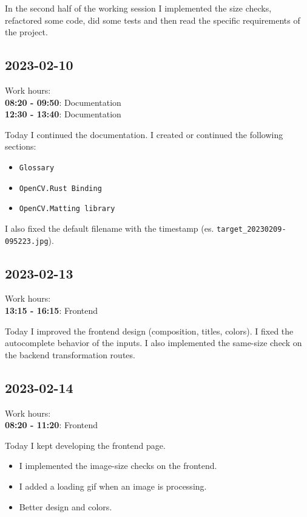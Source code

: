 \documentclass{article}
\begin{document}
In the second half of the working session I implemented the size checks, refactored some code,
did some tests and then read the specific requirements of the project.

\subsection{2023-02-10}

Work hours:\\
\textbf{08:20 - 09:50}: Documentation \\
\textbf{12:30 - 13:40}: Documentation

Today I continued the documentation.
I created or continued the following sections:
\begin{itemize}
    \item \texttt{Glossary}
    \item \texttt{OpenCV.Rust Binding}
    \item \texttt{OpenCV.Matting library}
\end{itemize}

I also fixed the default filename with the timestamp
(es. \texttt{target\_20230209-095223.jpg}).

\subsection{2023-02-13}

Work hours:\\
\textbf{13:15 - 16:15}: Frontend

Today I improved the frontend design (composition, titles, colors).
I fixed the autocomplete behavior of the inputs.
I also implemented the same-size check on the backend transformation
routes.

\subsection{2023-02-14}

Work hours:\\
\textbf{08:20 - 11:20}: Frontend

Today I kept developing the frontend page.
\begin{itemize}
    \item I implemented the image-size checks on the frontend.
    \item I added a loading gif when an image is processing.
    \item Better design and colors.
\end{itemize}
\end{document}

